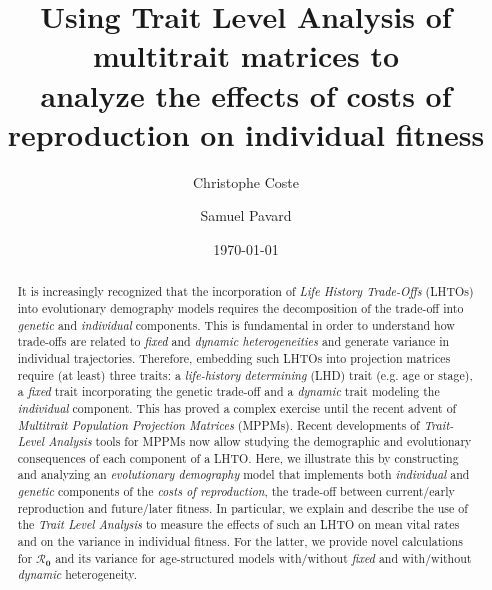 \documentclass[10pt,a4paper]{article}
\author[1,2]{Christophe Coste}
\author[2]{Samuel Pavard}
\affil[1]{\small MNHN \normalsize}
\affil[2]{\small NTNU}
\date{\today}
\newcommand{\Rzero}{$\boldsymbol{\mathcal{R}_{0}}$  }
\begin{document}



\title{\normalsize \textbf{Using Trait Level Analysis of multitrait matrices to \\analyze the effects of costs of reproduction on individual fitness}} 

\maketitle


\begin{abstract}
It is increasingly recognized that the incorporation of \emph{Life History Trade-Offs} (LHTOs) into evolutionary demography models requires the decomposition of the trade-off into \emph{genetic} and \emph{individual} components. This is fundamental in order to understand how trade-offs are related to \emph{fixed} and \emph{dynamic heterogeneities} and generate variance in individual trajectories.
Therefore, embedding such LHTOs into projection matrices require (at least) three traits: a \emph{life-history determining} (LHD) trait (e.g. age or stage), a \emph{fixed} trait incorporating the genetic trade-off and a \emph{dynamic} trait modeling the \emph{individual} component.  This has proved a complex exercise until the recent advent of \emph{Multitrait Population Projection Matrices} (MPPMs). 
Recent developments of \emph{Trait-Level Analysis} tools for MPPMs now allow studying the demographic and evolutionary consequences of each component of a LHTO. Here, we illustrate this by constructing and analyzing an \emph{evolutionary demography} model that implements both \emph{individual} and \emph{genetic} components of the \emph{costs of reproduction}, %
the trade-off between current/early reproduction and future/later fitness. 
In particular, we explain and describe the use of the \emph{Trait Level Analysis} to measure the effects of such an LHTO on mean vital rates and on the variance in individual fitness. %
For the latter, %
we provide novel calculations for \Rzero and its variance for age-structured models with/without \emph{fixed} and with/without \emph{dynamic} heterogeneity. %
\end{abstract}
\end{document}
